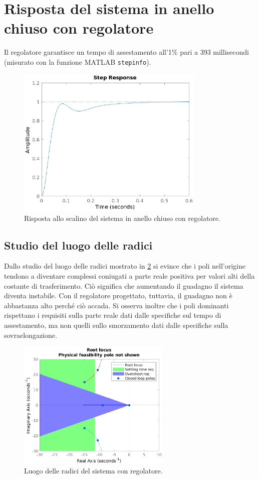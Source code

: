 \documentclass[a4paper]{article}
\begin{document}
\section{Risposta del sistema in anello chiuso con regolatore}
Il regolatore garantisce un tempo di assestamento all'1\% pari a 393 millisecondi (misurato con la funzione MATLAB \texttt{stepinfo}).
\begin{figure}[h!]
    \centering
    \includegraphics[width=0.8\textwidth]{step}
    \caption{Risposta allo scalino del sistema in anello chiuso con regolatore.}
    \label{fig:step}
\end{figure}

\subsection{Studio del luogo delle radici}
Dallo studio del luogo delle radici mostrato in \cref{fig:rlocus} si evince che i poli nell'origine tendono a diventare complessi coniugati a parte reale positiva per valori alti della costante di trasferimento.
Ciò significa che aumentando il guadagno il sistema diventa instabile.
Con il regolatore progettato, tuttavia, il guadagno non è abbastanza alto perché ciò accada.
Si osserva inoltre che i poli dominanti rispettano i requisiti sulla parte reale dati dalle specifiche sul tempo di assestamento, ma non quelli sullo smorzamento dati dalle specifiche sulla sovraelongazione.

\begin{figure}[h!]
    \centering
    \includegraphics[width=0.65\textwidth]{rlocus}
    \caption{Luogo delle radici del sistema con regolatore.}
    \label{fig:rlocus}
\end{figure}
\end{document}
